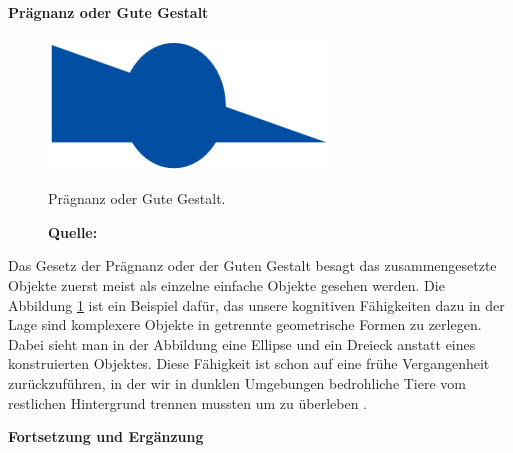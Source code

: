 \textbf{Prägnanz oder Gute Gestalt}

\begin{figure}[H]
  \centering
  \includegraphics[scale=1]{img/gesetz_der_Praegnanz_oder_der_Guten_Gestalt.PNG}
  \caption{Prägnanz oder Gute Gestalt.}
    \caption*{\textbf{Quelle:} \citep{Dahm2006}}
  \label{fig:praegnanzOderGuteGestalt}
\end{figure}
Das Gesetz der Prägnanz oder der Guten Gestalt besagt das zusammengesetzte Objekte zuerst meist als einzelne einfache Objekte gesehen werden. Die Abbildung \ref{fig:praegnanzOderGuteGestalt} ist ein Beispiel dafür, das unsere kognitiven Fähigkeiten dazu in der Lage sind komplexere Objekte in getrennte geometrische Formen zu zerlegen. Dabei sieht man in der Abbildung eine Ellipse und ein Dreieck anstatt eines konstruierten Objektes. Diese Fähigkeit ist schon auf eine frühe Vergangenheit zurückzuführen, in der wir in dunklen Umgebungen bedrohliche Tiere vom restlichen Hintergrund trennen mussten um zu überleben \citep[vgl.][61]{Dahm2006}.

\textbf{Fortsetzung und Ergänzung}

